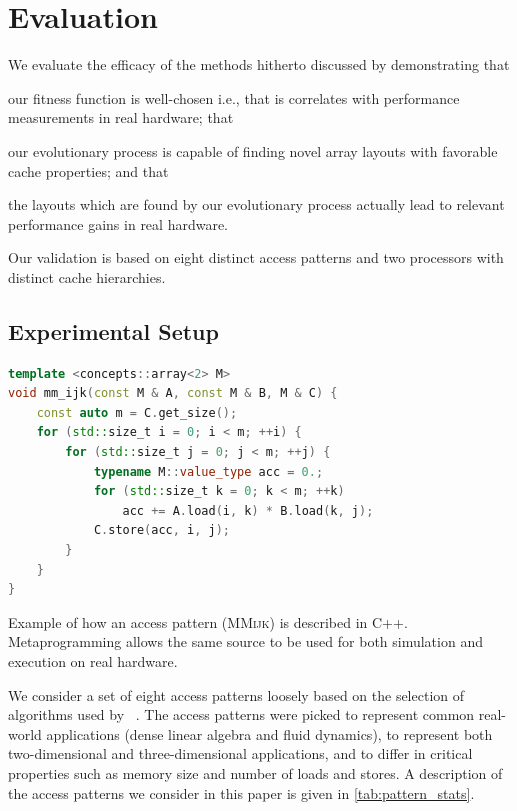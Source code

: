 \section{Evaluation}

\label{sec:experiments}

We evaluate the efficacy of the methods hitherto discussed by demonstrating that  
\begin{enumerate*}
    \item our fitness function is well-chosen i.e., that is correlates with performance measurements in real hardware; that
    \item our evolutionary process is capable of finding novel array layouts with favorable cache properties; and that
    \item the layouts which are found by our evolutionary process actually lead to relevant performance gains in real hardware.
\end{enumerate*}
Our validation is based on eight distinct access patterns and two processors with distinct cache hierarchies.

\subsection{Experimental Setup}

\begin{lstfloat}
\begin{lstlisting}[style=mystyle,frame=tlrb,basicstyle={\scriptsize\ttfamily},language=c++]
template <concepts::array<2> M>
void mm_ijk(const M & A, const M & B, M & C) {
    const auto m = C.get_size();
    for (std::size_t i = 0; i < m; ++i) {
        for (std::size_t j = 0; j < m; ++j) {
            typename M::value_type acc = 0.;
            for (std::size_t k = 0; k < m; ++k)
                acc += A.load(i, k) * B.load(k, j);
            C.store(acc, i, j);
        }
    }
}
\end{lstlisting}\vspace{-2mm}
\caption{Example of how an access pattern (\textsc{MMijk}) is described in C++. Metaprogramming allows the same source to be used for both simulation and execution on real hardware.}
\label{lst:mmijk_example}
\end{lstfloat}

We consider a set of eight access patterns loosely based on the selection of algorithms used by \citeauthor{10.1002/cpe.1018}~\cite{10.1002/cpe.1018}. The access patterns were picked to represent common real-world applications (dense linear algebra and fluid dynamics), to represent both two-dimensional and three-dimensional applications, and to differ in critical properties such as memory size and number of loads and stores. A description of the access patterns we consider in this paper is given in \cref{tab:pattern_stats}.

